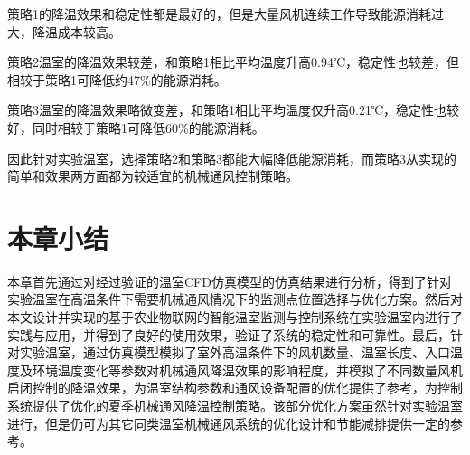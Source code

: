 策略1的降温效果和稳定性都是最好的，但是大量风机连续工作导致能源消耗过大，降温成本较高。

策略2温室的降温效果较差，和策略1相比平均温度升高0.94℃，稳定性也较差，但相较于策略1可降低约47\%的能源消耗。

策略3温室的降温效果略微变差，和策略1相比平均温度仅升高0.21℃，稳定性也较好，同时相较于策略1可降低60\%的能源消耗。

因此针对实验温室，选择策略2和策略3都能大幅降低能源消耗，而策略3从实现的简单和效果两方面都为较适宜的机械通风控制策略。

\section{本章小结}
本章首先通过对经过验证的温室CFD仿真模型的仿真结果进行分析，得到了针对实验温室在高温条件下需要机械通风情况下的监测点位置选择与优化方案。然后对本文设计并实现的基于农业物联网的智能温室监测与控制系统在实验温室内进行了实践与应用，并得到了良好的使用效果，验证了系统的稳定性和可靠性。最后，针对实验温室，通过仿真模型模拟了室外高温条件下的风机数量、温室长度、入口温度及环境温度变化等参数对机械通风降温效果的影响程度，并模拟了不同数量风机启闭控制的降温效果，为温室结构参数和通风设备配置的优化提供了参考，为控制系统提供了优化的夏季机械通风降温控制策略。该部分优化方案虽然针对实验温室进行，但是仍可为其它同类温室机械通风系统的优化设计和节能减排提供一定的参考。
